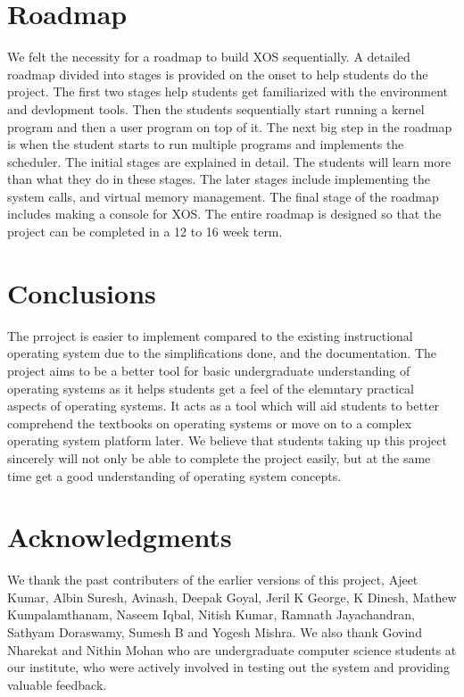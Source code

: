 \documentclass{sig-alternate}
\begin{document}
\section{Roadmap}
We felt the necessity for a roadmap to build XOS sequentially. A detailed roadmap divided into stages is provided on the onset to help students do the project. The first two stages help students get familiarized with the environment and devlopment tools. Then the students sequentially start running a kernel program and then a user program on top of it. The next big step in the roadmap is when the student starts to run multiple programs and implements the scheduler. The initial stages are explained in detail. The students will learn more than what they do in these stages. The later stages include implementing the system calls, and virtual memory management. The final stage of the roadmap includes making a console for XOS. The entire roadmap is designed so that the project can be completed in a 12 to 16 week term. \\

\section{Conclusions}
The prroject is easier to implement compared to the existing instructional operating system due to the simplifications done, and the documentation. The project aims to be a better tool for basic undergraduate understanding of operating systems as it helps students get a feel of the elemntary practical aspects of operating systems. It acts as a tool which will aid students to better comprehend the textbooks on operating systems or move on to a complex operating system platform later. We believe that students taking up this project sincerely will not only be able to complete the project easily, but at the same time get a good understanding of operating system concepts. 


\section{Acknowledgments}
We thank the past contributers of the earlier versions of this project, Ajeet Kumar, Albin Suresh, Avinash, Deepak Goyal, Jeril K George, K Dinesh, Mathew Kumpalamthanam, Naseem Iqbal, Nitish Kumar, Ramnath Jayachandran, Sathyam Doraswamy, Sumesh B and Yogesh Mishra. We also thank Govind Nharekat and Nithin Mohan who are undergraduate computer science students at our institute, who were actively involved in testing out the system and providing valuable feedback. 
\end{document}
